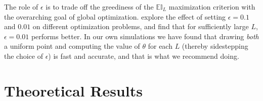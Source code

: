 \documentclass[letterpaper,11pt]{article}
\theoremstyle{myplain}
\theoremstyle{mydefinition}
\theoremstyle{myremark}
\renewcommand{\cite}{\citet}
\numberwithin{equation}{section}
\numberwithin{figure}{section}
\begin{document}
The role of $\epsilon$ \citep[e.g.,][p. 2889]{Bull_Convergence_2011} is to trade off the greediness of the $\mathbb{EI}_L$ maximization criterion with the overarching goal of global optimization. \cite[pp. 28-29]{sut:bar98} explore the effect of setting $\epsilon=0.1$ and $0.01$ on different optimization problems, and find that for sufficiently large $L$, $\epsilon=0.01$  performs  better.
In our own simulations we have found that drawing \emph{both} a uniform point and computing the value of $\theta$ for each $L$ (thereby sidestepping the choice of $\epsilon$) is fast and accurate, and that is what we recommend doing.


\section{Theoretical Results}
\label{sec:main}
\end{document}
